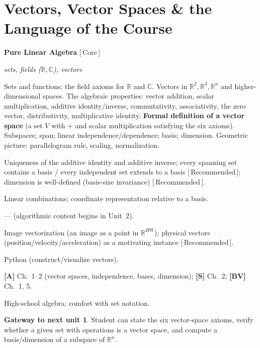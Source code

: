 \documentclass[11pt]{article}
\newcommand{\dom}[1]{{\sffamily\bfseries\color{RoyalBlue}#1}}
\newcommand{\pri}[1]{{\footnotesize\sffamily\color{BrickRed}[\,#1\,]}}
\newcommand{\obj}[1]{{\itshape #1}}
\newenvironment{unitfields}
  {\begin{description}[leftmargin=0pt,labelindent=0pt,style=nextline,
      font=\normalfont\sffamily\bfseries\color{RoyalBlue},itemsep=3pt,topsep=4pt]}
  {\end{description}}
\newcommand{\ff}[1]{\item[#1]}
\theoremstyle{definition}
\newtheorem*{gateway}{Gateway to next unit}
\begin{document}
\section{Vectors, Vector Spaces \& the Language of the Course}
\begin{unitfields}
\ff{Domain(s)} \dom{Pure Linear Algebra} \pri{Core}
\ff{Primary object(s)} \obj{sets, fields ($\mathbb{R},\mathbb{C}$), vectors}
\ff{Topics}
  Sets and functions; the field axioms for $\mathbb{R}$ and $\mathbb{C}$.
  Vectors in $\mathbb{R}^2,\mathbb{R}^3,\mathbb{R}^n$ and higher-dimensional
  spaces. The algebraic properties: vector addition, scalar multiplication,
  additive identity/inverse, commutativity, associativity, the zero vector,
  distributivity, multiplicative identity. \textbf{Formal definition of a
  vector space} (a set $V$ with $+$ and scalar multiplication satisfying the
  six axioms). Subspaces; span; linear independence/dependence; basis;
  dimension. Geometric picture: parallelogram rule, scaling, normalization.
\ff{Key theorems}
  Uniqueness of the additive identity and additive inverse;
  every spanning set contains a basis / every independent set extends to a
  basis \pri{Recommended}; dimension is well-defined (basis-size invariance)
  \pri{Recommended}.
\ff{Tools / formulas}
  Linear combinations; coordinate representation relative to a basis.
\ff{Algorithms} --- (algorithmic content begins in Unit~2).
\ff{Applications}
  Image vectorization (an image as a point in $\mathbb{R}^{HW}$);
  physical vectors (position/velocity/acceleration) as a motivating instance
  \pri{Recommended}.
\ff{Languages} Python (construct/visualize vectors).
\ff{Textbook refs}
  \textbf{[A]} Ch.~1--2 (vector spaces, independence, bases, dimension);
  \textbf{[S]} Ch.~2; \textbf{[BV]} Ch.~1, 5.
\ff{ENTER} High-school algebra; comfort with set notation.
\end{unitfields}
\begin{gateway}
Student can state the six vector-space axioms, verify whether a given set with
operations is a vector space, and compute a basis/dimension of a subspace of
$\mathbb{R}^n$.
\end{gateway}

\end{document}
